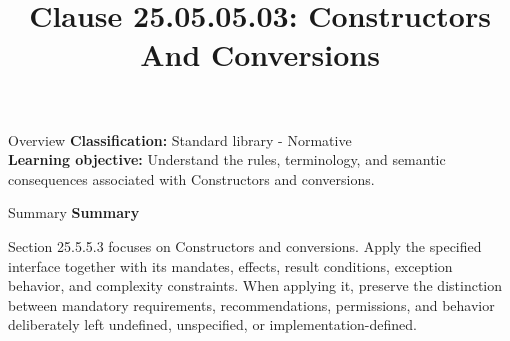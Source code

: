 \documentclass[10pt,letterpaper]{article}
\title{Clause 25.05.05.03: Constructors And Conversions}
\author{}
\date{}
\begin{document}
\maketitle
\begin{CornellOverviewBox}{Overview}
\textbf{Classification:} Standard library - Normative\\[2pt]
\textbf{Learning objective:} Understand the rules, terminology, and semantic consequences associated with Constructors and conversions.
\end{CornellOverviewBox}\begin{CornellSummaryBox}{Summary}
{\sffamily\bfseries\color{Accent} Summary}\par\vspace{3pt}Section 25.5.5.3 focuses on Constructors and conversions. Apply the specified interface together with its mandates, effects, result conditions, exception behavior, and complexity constraints. When applying it, preserve the distinction between mandatory requirements, recommendations, permissions, and behavior deliberately left undefined, unspecified, or implementation-defined.
\end{CornellSummaryBox}
\end{document}
